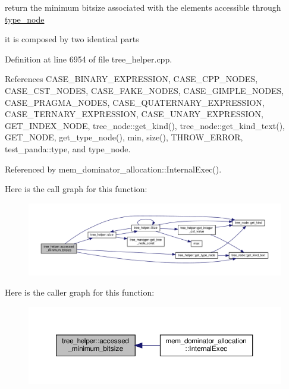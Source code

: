 return the minimum bitsize associated with the elements accessible through \hyperlink{structtype__node}{type\+\_\+node} 

it is composed by two identical parts 

Definition at line 6954 of file tree\+\_\+helper.\+cpp.



References C\+A\+S\+E\+\_\+\+B\+I\+N\+A\+R\+Y\+\_\+\+E\+X\+P\+R\+E\+S\+S\+I\+ON, C\+A\+S\+E\+\_\+\+C\+P\+P\+\_\+\+N\+O\+D\+ES, C\+A\+S\+E\+\_\+\+C\+S\+T\+\_\+\+N\+O\+D\+ES, C\+A\+S\+E\+\_\+\+F\+A\+K\+E\+\_\+\+N\+O\+D\+ES, C\+A\+S\+E\+\_\+\+G\+I\+M\+P\+L\+E\+\_\+\+N\+O\+D\+ES, C\+A\+S\+E\+\_\+\+P\+R\+A\+G\+M\+A\+\_\+\+N\+O\+D\+ES, C\+A\+S\+E\+\_\+\+Q\+U\+A\+T\+E\+R\+N\+A\+R\+Y\+\_\+\+E\+X\+P\+R\+E\+S\+S\+I\+ON, C\+A\+S\+E\+\_\+\+T\+E\+R\+N\+A\+R\+Y\+\_\+\+E\+X\+P\+R\+E\+S\+S\+I\+ON, C\+A\+S\+E\+\_\+\+U\+N\+A\+R\+Y\+\_\+\+E\+X\+P\+R\+E\+S\+S\+I\+ON, G\+E\+T\+\_\+\+I\+N\+D\+E\+X\+\_\+\+N\+O\+DE, tree\+\_\+node\+::get\+\_\+kind(), tree\+\_\+node\+::get\+\_\+kind\+\_\+text(), G\+E\+T\+\_\+\+N\+O\+DE, get\+\_\+type\+\_\+node(), min, size(), T\+H\+R\+O\+W\+\_\+\+E\+R\+R\+OR, test\+\_\+panda\+::type, and type\+\_\+node.



Referenced by mem\+\_\+dominator\+\_\+allocation\+::\+Internal\+Exec().

Here is the call graph for this function\+:
\nopagebreak
\begin{figure}[H]
\begin{center}
\leavevmode
\includegraphics[width=350pt]{d7/d99/classtree__helper_adc5caf4fcc334a09a633086e5efca1f3_cgraph}
\end{center}
\end{figure}
Here is the caller graph for this function\+:
\nopagebreak
\begin{figure}[H]
\begin{center}
\leavevmode
\includegraphics[width=350pt]{d7/d99/classtree__helper_adc5caf4fcc334a09a633086e5efca1f3_icgraph}
\end{center}
\end{figure}
\mbox{\label{classtree__helper_a55c8ae98513afb49111c0990c05c7764}} 
